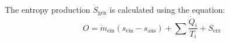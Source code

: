 The entropy production \( \dot{S}_{\text{gen}} \) is calculated using the equation:  
\[
O = \dot{m}_{\text{ein}} (s_{\text{ein}} - s_{\text{aus}}) + \sum \frac{\dot{Q}_i}{T_i} + S_{\text{erz}}
\]